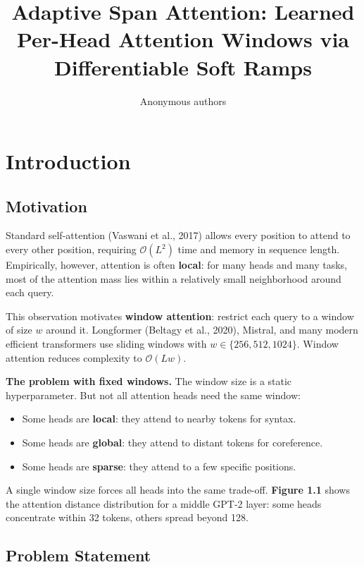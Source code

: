 \title{\textbf{Adaptive Span Attention: Learned Per-Head Attention Windows via Differentiable Soft Ramps}}

\author{Anonymous authors}



\section{Introduction}

\subsection{Motivation}

Standard self-attention (Vaswani et al., 2017) allows every position to attend 
to every other position, requiring $\mathcal{O}(L^2)$ time and memory in 
sequence length. Empirically, however, attention is often \textbf{local}: for many 
heads and many tasks, most of the attention mass lies within a relatively 
small neighborhood around each query.

This observation motivates \textbf{window attention}: restrict each query to a 
window of size $w$ around it. Longformer (Beltagy et al., 2020), Mistral, and 
many modern efficient transformers use sliding windows with $w \in \{256, 
512, 1024\}$. Window attention reduces complexity to $\mathcal{O}(L w)$.

\textbf{The problem with fixed windows.} The window size is a static hyperparameter. 
But not all attention heads need the same window:

\begin{itemize}
\item Some heads are \textbf{local}: they attend to nearby tokens for syntax.
\item Some heads are \textbf{global}: they attend to distant tokens for coreference.
\item Some heads are \textbf{sparse}: they attend to a few specific positions.

\end{itemize}
A single window size forces all heads into the same trade-off. \textbf{Figure 1.1} 
shows the attention distance distribution for a middle GPT-2 layer: some heads 
concentrate within 32 tokens, others spread beyond 128.

\subsection{Problem Statement}

